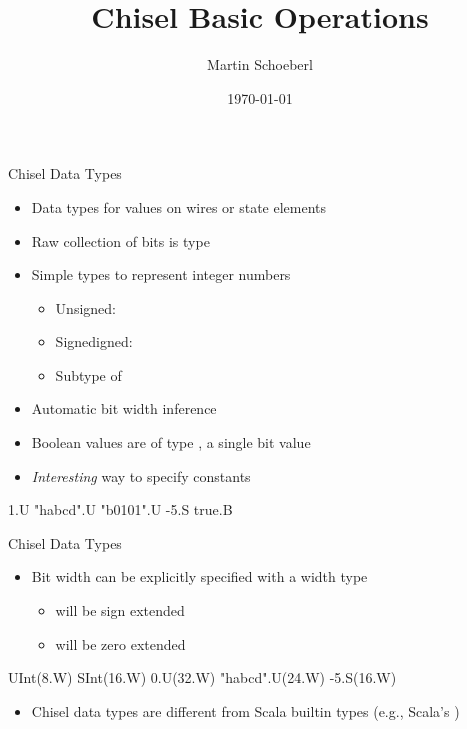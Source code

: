 

\newif\ifbook


\title{Chisel Basic Operations}
\author{Martin Schoeberl}
\date{\today}



\begin{frame}
\titlepage
\end{frame}

\begin{frame}[fragile]{Chisel Data Types}
\begin{itemize}
\item Data types for values on wires or state elements
\item Raw collection of bits is type 
\item Simple types to represent integer numbers
\begin{itemize}
\item Unsigned: 
\item Signedigned: 
\item Subtype of 
\end{itemize}
\item Automatic bit width inference
\item Boolean values are of type , a single bit value
\item \emph{Interesting} way to specify constants
\end{itemize}
\begin{chisel}
1.U
"habcd".U
"b0101".U
-5.S
true.B
\end{chisel}
\end{frame}

\begin{frame}[fragile]{Chisel Data Types}
\begin{itemize}
\item Bit width can be explicitly specified with a width type
\begin{itemize}
\item {} will be sign extended
\item {} will be zero extended
\end{itemize}
\end{itemize}
\begin{chisel}
UInt(8.W)
SInt(16.W)
0.U(32.W)
"habcd".U(24.W)
-5.S(16.W)
\end{chisel}
\begin{itemize}
\item Chisel data types are different from Scala builtin types (e.g., Scala's )
\end{itemize}
\end{frame}

